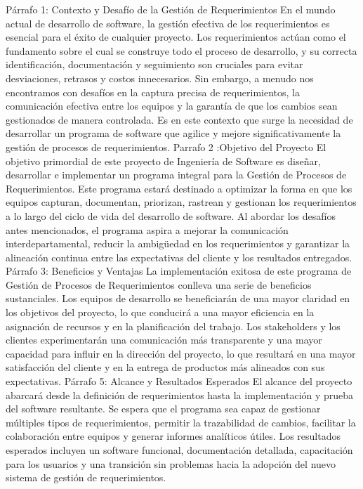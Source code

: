 Párrafo 1: Contexto y Desafío de la Gestión de Requerimientos
En el mundo actual de desarrollo de software, la gestión efectiva de los requerimientos es esencial para el éxito de cualquier proyecto. Los requerimientos actúan como el fundamento sobre el cual se construye todo el proceso de desarrollo, y su correcta identificación, documentación y seguimiento son cruciales para evitar desviaciones, retrasos y costos innecesarios. Sin embargo, a menudo nos encontramos con desafíos en la captura precisa de requerimientos, la comunicación efectiva entre los equipos y la garantía de que los cambios sean gestionados de manera controlada. Es en este contexto que surge la necesidad de desarrollar un programa de software que agilice y mejore significativamente la gestión de procesos de requerimientos.
Parrafo 2 :Objetivo del Proyecto
El objetivo primordial de este proyecto de Ingeniería de Software es diseñar, desarrollar e implementar un programa integral para la Gestión de Procesos de Requerimientos. Este programa estará destinado a optimizar la forma en que los equipos capturan, documentan, priorizan, rastrean y gestionan los requerimientos a lo largo del ciclo de vida del desarrollo de software. Al abordar los desafíos antes mencionados, el programa aspira a mejorar la comunicación interdepartamental, reducir la ambigüedad en los requerimientos y garantizar la alineación continua entre las expectativas del cliente y los resultados entregados.
Párrafo 3: Beneficios y Ventajas
La implementación exitosa de este programa de Gestión de Procesos de Requerimientos conlleva una serie de beneficios sustanciales. Los equipos de desarrollo se beneficiarán de una mayor claridad en los objetivos del proyecto, lo que conducirá a una mayor eficiencia en la asignación de recursos y en la planificación del trabajo. Los stakeholders y los clientes experimentarán una comunicación más transparente y una mayor capacidad para influir en la dirección del proyecto, lo que resultará en una mayor satisfacción del cliente y en la entrega de productos más alineados con sus expectativas.
Párrafo 5: Alcance y Resultados Esperados
El alcance del proyecto abarcará desde la definición de requerimientos hasta la implementación y prueba del software resultante. Se espera que el programa sea capaz de gestionar múltiples tipos de requerimientos, permitir la trazabilidad de cambios, facilitar la colaboración entre equipos y generar informes analíticos útiles. Los resultados esperados incluyen un software funcional, documentación detallada, capacitación para los usuarios y una transición sin problemas hacia la adopción del nuevo sistema de gestión de requerimientos.
